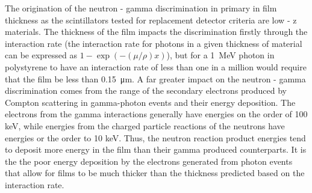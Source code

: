 The origination of the neutron - gamma discrimination in primary in film thickness as the scintillators tested for replacement detector criteria are low - z materials.
The thickness of the film impacts the discrimination firstly through the interaction rate (the interaction rate for photons in a given thickness of material can be expressed as $1-\exp\left(-(\mu/\rho)x \right )$), but for a \SI{1}{\MeV} photon in polystyrene to have an interaction rate of less than one in a million would require that the film be less than \SI{0.15}{\um}.
A far greater impact on the neutron - gamma discrimination comes from the range of the secondary electrons produced by Compton scattering in gamma-photon events and their energy deposition.
The electrons from the gamma interactions generally have energies on the order of 100 keV, while energies from the charged particle reactions of the neutrons have energies or the order to 10 keV.
Thus, the neutron reaction product energies tend to deposit more energy in the film than their gamma produced counterparts.
It is the the poor energy deposition by the electrons generated from photon events that allow for films to be much thicker than the thickness predicted based on the interaction rate.

